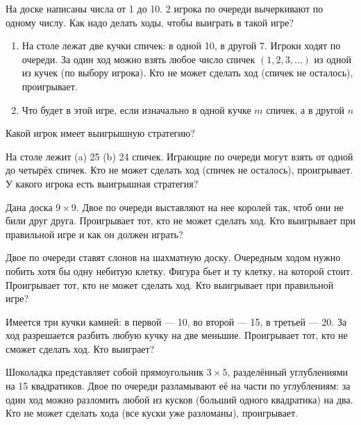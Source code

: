 \documentclass{article}
\begin{document}
    \begin{enumerate_boxed}

        \item На доске написаны числа от 1 до 10.
        2 игрока по очереди вычеркивают по одному числу.
        Как надо делать ходы, чтобы выиграть в такой игре?

        \item
        \begin{enumerate}
            \item На столе лежат две кучки спичек: в одной 10, в другой 7.
            Игроки ходят по очереди.
            За один ход можно взять любое число спичек $(1, 2, 3, \dots)$ из одной из кучек (по выбору игрока).
            Кто не может сделать ход (спичек не осталось), проигрывает.
            \item Что будет в этой игре, если изначально в одной кучке $m$ спичек, а в другой $n$
        \end{enumerate}

        Какой игрок имеет выигрышную стратегию?

        \item На столе лежит (a) 25 (b) 24 спичек.
        Играющие по очереди могут взять от одной до четырёх спичек.
        Кто не может сделать ход (спичек не осталось), проигрывает.
        У какого игрока есть выигрышная стратегия?

        \item Дана доска $9 \times 9$.
        Двое по очереди выставляют на нее королей так, чтоб они не били друг друга.
        Проигрывает тот, кто не может сделать ход.
        Кто выигрывает при правильной игре и как он должен играть?

        \item Двое по очереди ставят слонов на шахматную доску.
        Очередным ходом нужно побить хотя бы одну небитую клетку.
        Фигура бьет и ту клетку, на которой стоит.
        Проигрывает тот, кто не может сделать ход.
        Кто выигрывает при правильной игре?

        \item Имеется три кучки камней: в первой --- 10, во второй --- 15, в третьей --- 20.
        За ход разрешается разбить любую кучку на две меньшие.
        Проигрывает тот, кто не сможет сделать ход.
        Кто выиграет?

        \item Шоколадка представляет собой прямоугольник $3 \times 5$, разделённый углублениями на 15 квадратиков.
        Двое по очереди разламывают её на части по углублениям: за один ход можно разломить любой из кусков (больший одного квадратика) на два.
        Кто не может сделать хода (все куски уже разломаны), проигрывает.


\end{enumerate_boxed}
\end{document}

